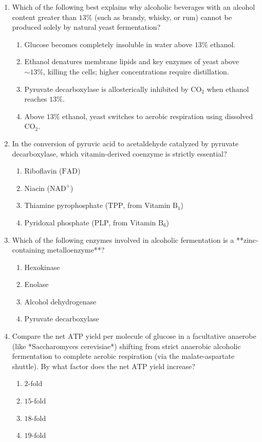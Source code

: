 \documentclass[11pt, a4paper]{article}
\begin{document}
\begin{enumerate}[label=\textbf{\arabic*.}]
\item Which of the following best explains why alcoholic beverages with an alcohol content greater than $13\%$ (such as brandy, whisky, or rum) cannot be produced solely by natural yeast fermentation?
\begin{enumerate}[label=(\Alph*)]
    \item Glucose becomes completely insoluble in water above $13\%$ ethanol.
    \item Ethanol denatures membrane lipids and key enzymes of yeast above $\sim 13\%$, killing the cells; higher concentrations require distillation.
    \item Pyruvate decarboxylase is allosterically inhibited by $\text{CO}_2$ when ethanol reaches $13\%$.
    \item Above $13\%$ ethanol, yeast switches to aerobic respiration using dissolved $\text{CO}_2$.
\end{enumerate}

\item In the conversion of pyruvic acid to acetaldehyde catalyzed by pyruvate decarboxylase, which vitamin-derived coenzyme is strictly essential?
\begin{enumerate}[label=(\Alph*)]
    \item Riboflavin ($\text{FAD}$)
    \item Niacin ($\text{NAD}^+$)
    \item Thiamine pyrophosphate ($\text{TPP}$, from Vitamin $\text{B}_1$)
    \item Pyridoxal phosphate ($\text{PLP}$, from Vitamin $\text{B}_6$)
\end{enumerate}

\item Which of the following enzymes involved in alcoholic fermentation is a **zinc-containing metalloenzyme**?
\begin{enumerate}[label=(\Alph*)]
    \item Hexokinase
    \item Enolase
    \item Alcohol dehydrogenase
    \item Pyruvate decarboxylase
\end{enumerate}

\item Compare the net $\text{ATP}$ yield per molecule of glucose in a facultative anaerobe (like *Saccharomyces cerevisiae*) shifting from strict anaerobic alcoholic fermentation to complete aerobic respiration (via the malate-aspartate shuttle). By what factor does the net $\text{ATP}$ yield increase?
\begin{enumerate}[label=(\Alph*)]
    \item $2\text{-fold}$
    \item $15\text{-fold}$
    \item $18\text{-fold}$
    \item $19\text{-fold}$
\end{enumerate}


\end{enumerate}
\end{document}
